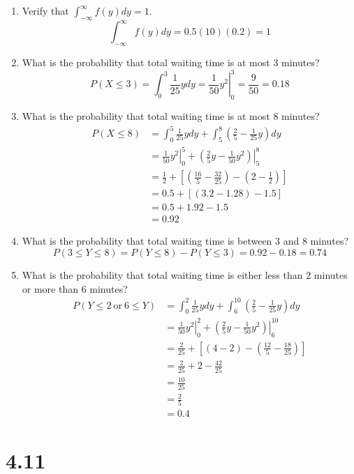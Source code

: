 \documentclass[letterpaper,12pt,fleqn]{article}
\begin{document}
\begin{enumerate}[label={\alph*)}]
\item Verify that \(\int_{-\infty}^{\infty}f(y)dy=1\).
  \[\int_{-\infty}^{\infty}f(y)dy=0.5(10)(0.2)=1\]
\item What is the probability that total waiting time is at most 3 minutes?
  \[P(X\le3)=\int_0^3\frac{1}{25}ydy=\left.\frac{1}{50}y^2\right|_0^3=\frac{9}{50}=0.18\]
\item What is the probability that total waiting time is at most 8 minutes?
  \begin{align*}
    P(X\le8) &= \int_0^5\frac{1}{25}ydy+\int_5^8\left(\frac{2}{5}-\frac{1}{25}y\right)dy \\
    &= \left.\frac{1}{50}y^2\right|_0^5+\left.\left(\frac{2}{5}y-\frac{1}{50}y^2\right)\right|_5^8 \\
    &= \frac{1}{2}+\left[\left(\frac{16}{5}-\frac{32}{25}\right)-\left(2-\frac{1}{2}\right)\right] \\
    &= 0.5 +[(3.2-1.28)-1.5] \\
    &= 0.5+1.92-1.5 \\
    &= 0.92
  \end{align*}
\item What is the probability that total waiting time is between 3 and 8 minutes?
  \[P(3\le Y\le8)=P(Y\le8)-P(Y\le3)=0.92-0.18=0.74\]
\item What is the probability that total waiting time is either less than 2 minutes or more than 6 minutes?
  \begin{align*}
    P(Y\le2\ \text{or}\ 6\le Y) &= \int_0^2\frac{1}{25}ydy+\int_6^{10}\left(\frac{2}{5}-\frac{1}{25}y\right)dy \\
    &= \left.\frac{1}{50}y^2\right|_0^2+\left.\left(\frac{2}{5}y-\frac{1}{50}y^2\right)\right|_6^{10} \\
    &= \frac{2}{25}+\left[(4-2)-\left(\frac{12}{5}-\frac{18}{25}\right)\right] \\
    &= \frac{2}{25}+2-\frac{42}{25} \\
    &= \frac{10}{25} \\
    &= \frac{2}{5} \\
    &= 0.4
  \end{align*}
\end{enumerate}

\section*{4.11}
\end{document}
